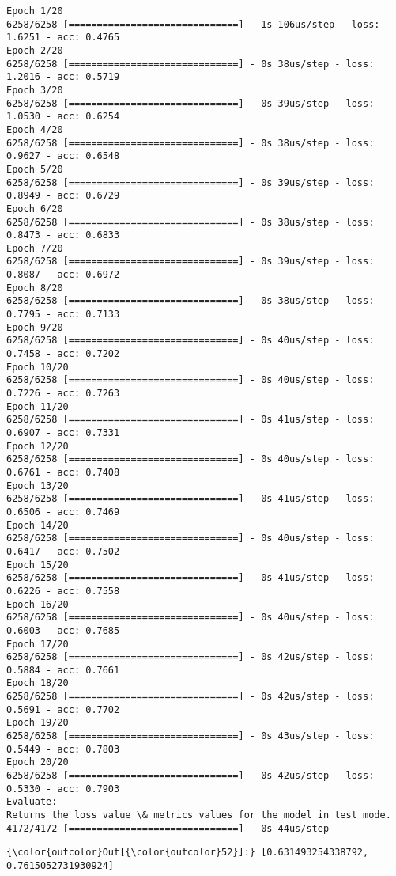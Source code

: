 \documentclass[11pt]{article}
\begin{document}
    \begin{Verbatim}[commandchars=\\\{\}]
Epoch 1/20
6258/6258 [==============================] - 1s 106us/step - loss: 1.6251 - acc: 0.4765
Epoch 2/20
6258/6258 [==============================] - 0s 38us/step - loss: 1.2016 - acc: 0.5719
Epoch 3/20
6258/6258 [==============================] - 0s 39us/step - loss: 1.0530 - acc: 0.6254
Epoch 4/20
6258/6258 [==============================] - 0s 38us/step - loss: 0.9627 - acc: 0.6548
Epoch 5/20
6258/6258 [==============================] - 0s 39us/step - loss: 0.8949 - acc: 0.6729
Epoch 6/20
6258/6258 [==============================] - 0s 38us/step - loss: 0.8473 - acc: 0.6833
Epoch 7/20
6258/6258 [==============================] - 0s 39us/step - loss: 0.8087 - acc: 0.6972
Epoch 8/20
6258/6258 [==============================] - 0s 38us/step - loss: 0.7795 - acc: 0.7133
Epoch 9/20
6258/6258 [==============================] - 0s 40us/step - loss: 0.7458 - acc: 0.7202
Epoch 10/20
6258/6258 [==============================] - 0s 40us/step - loss: 0.7226 - acc: 0.7263
Epoch 11/20
6258/6258 [==============================] - 0s 41us/step - loss: 0.6907 - acc: 0.7331
Epoch 12/20
6258/6258 [==============================] - 0s 40us/step - loss: 0.6761 - acc: 0.7408
Epoch 13/20
6258/6258 [==============================] - 0s 41us/step - loss: 0.6506 - acc: 0.7469
Epoch 14/20
6258/6258 [==============================] - 0s 40us/step - loss: 0.6417 - acc: 0.7502
Epoch 15/20
6258/6258 [==============================] - 0s 41us/step - loss: 0.6226 - acc: 0.7558
Epoch 16/20
6258/6258 [==============================] - 0s 40us/step - loss: 0.6003 - acc: 0.7685
Epoch 17/20
6258/6258 [==============================] - 0s 42us/step - loss: 0.5884 - acc: 0.7661
Epoch 18/20
6258/6258 [==============================] - 0s 42us/step - loss: 0.5691 - acc: 0.7702
Epoch 19/20
6258/6258 [==============================] - 0s 43us/step - loss: 0.5449 - acc: 0.7803
Epoch 20/20
6258/6258 [==============================] - 0s 42us/step - loss: 0.5330 - acc: 0.7903
Evaluate:
Returns the loss value \& metrics values for the model in test mode.
4172/4172 [==============================] - 0s 44us/step

    \end{Verbatim}

\begin{Verbatim}[commandchars=\\\{\}]
{\color{outcolor}Out[{\color{outcolor}52}]:} [0.631493254338792, 0.7615052731930924]
\end{Verbatim}
            
\end{document}

